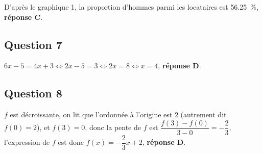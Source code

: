 \documentclass[10pt]{article}
\providecommand{\np}[2][]{{#2~#1}}
\begin{document}
D'après le graphique 1, la proportion d'hommes parmi les locataires est \np{56.25}\%, \textbf{réponse C}.

\subsection*{Question 7}



















\mbox{$6x-5=4x+3\iff 2x-5=3\iff2x=8\iff x=4$}, \textbf{réponse D}.
\subsection*{Question 8}



















































$f$ est décroissante, on lit que l'ordonnée à l'origine est $2$ (autrement dit \mbox{$f(0)=2$}), et \mbox{$f(3)=0$}, donc la pente de $f$ est \mbox{$\dfrac{f(3)-f(0)}{3-0}=-\dfrac23$}, l'expression de $f$ est donc \mbox{$f(x)=-\dfrac23 x +2$}, \textbf{réponse D}.
\end{document}
